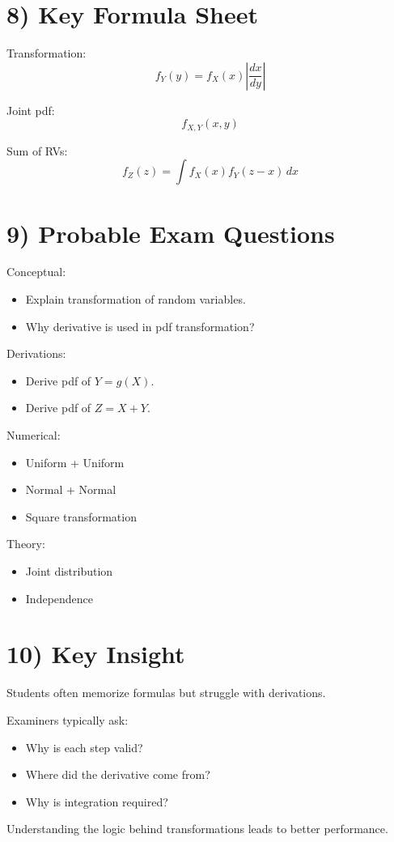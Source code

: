 \documentclass[12pt,a4paper]{article}
\begin{document}
\section*{8) Key Formula Sheet}

Transformation:
\[
f_Y(y) = f_X(x)\left|\frac{dx}{dy}\right|
\]

Joint pdf:
\[
f_{X,Y}(x,y)
\]

Sum of RVs:
\[
f_Z(z)=\int f_X(x)f_Y(z-x)\,dx
\]

\section*{9) Probable Exam Questions}

Conceptual:
\begin{itemize}
\item Explain transformation of random variables.
\item Why derivative is used in pdf transformation?
\end{itemize}

Derivations:
\begin{itemize}
\item Derive pdf of $Y=g(X)$.
\item Derive pdf of $Z=X+Y$.
\end{itemize}

Numerical:
\begin{itemize}
\item Uniform + Uniform
\item Normal + Normal
\item Square transformation
\end{itemize}

Theory:
\begin{itemize}
\item Joint distribution
\item Independence
\end{itemize}

\section*{10) Key Insight}

Students often memorize formulas but struggle with derivations.

Examiners typically ask:

\begin{itemize}
\item Why is each step valid?
\item Where did the derivative come from?
\item Why is integration required?
\end{itemize}

Understanding the logic behind transformations leads to better performance.
\end{document}
